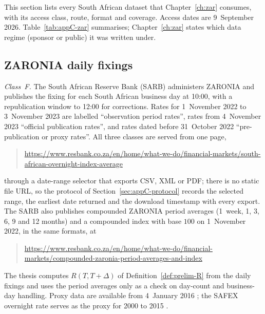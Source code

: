 
This section lists every South African dataset that Chapter~\ref{ch:zar} consumes, with its access class, route, format and coverage. Access dates are 9~September 2026. Table~\ref{tab:appC-zar} summarises; Chapter~\ref{ch:zar} states which data regime (sponsor or public) it was written under.

\subsection{ZARONIA daily fixings}\label{sec:appC-zaronia}

\emph{Class~F.} The South African Reserve Bank (SARB) administers ZARONIA and publishes the fixing for each South African business day at 10:00, with a republication window to 12:00 for corrections. Rates for 1~November 2022 to 3~November 2023 are labelled ``observation period rates'', rates from 4~November 2023 ``official publication rates'', and rates dated before 31~October 2022 ``pre-publication or proxy rates''. All three classes are served from one page,
\begin{quote}\footnotesize\raggedright\url{https://www.resbank.co.za/en/home/what-we-do/financial-markets/south-african-overnight-index-average}
\end{quote}
through a date-range selector that exports CSV, XML or PDF; there is no static file URL, so the protocol of Section~\ref{sec:appC-protocol} records the selected range, the earliest date returned and the download timestamp with every export. The SARB also publishes compounded ZARONIA period averages (1~week, 1, 3, 6, 9 and 12 months) and a compounded index with base $100$ on 1~November 2022, in the same formats, at
\begin{quote}\footnotesize\raggedright\url{https://www.resbank.co.za/en/home/what-we-do/financial-markets/compounded-zaronia-period-averages-and-index}
\end{quote}
The thesis computes $R(T,T+\Delta)$ of Definition~\ref{def:prelim-R} from the daily fixings and uses the period averages only as a check on day-count and business-day handling. Proxy data are available from 4~January 2016 \citep[\S5.1, p.~9]{sarb2025fallback}; the SAFEX overnight rate serves as the proxy for 2000 to 2015 \citep[\S2, p.~4]{sarb2025ois}.

